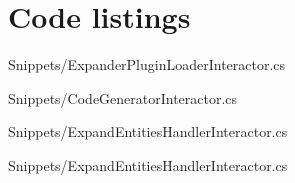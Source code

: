 \chapter{Code listings} \label{appendix_code_listings} 

 
  {Snippets/ExpanderPluginLoaderInteractor.cs}

 
  {Snippets/CodeGeneratorInteractor.cs}

 
  {Snippets/ExpandEntitiesHandlerInteractor.cs}

  
    {Snippets/ExpandEntitiesHandlerInteractor.cs}